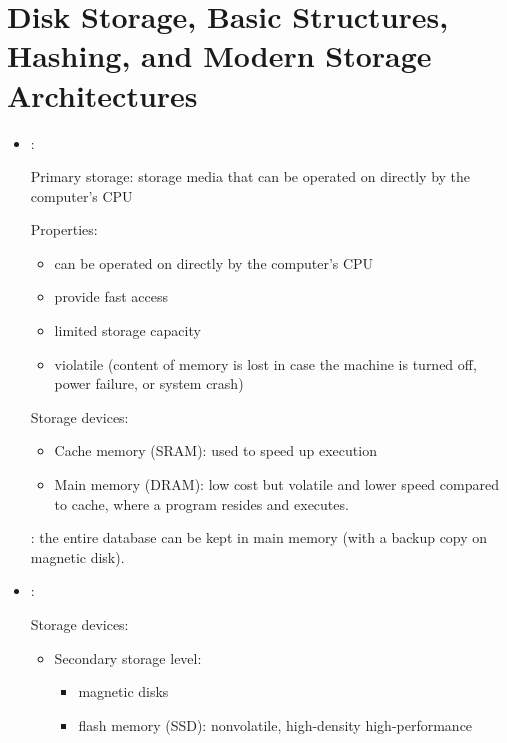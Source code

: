 \chapter{Disk Storage, Basic Structures, Hashing, and Modern Storage Architectures}

      \begin{itemize}
        \item {}:
          \par Primary storage: storage media that can be operated on directly by the computer’s CPU
          \par Properties:
            \begin{itemize}
              \item can be operated on directly by the computer’s CPU
              \item provide fast access
              \item limited storage capacity
              \item violatile (content of memory is lost in case the machine is turned off, power failure, or system crash)
            \end{itemize}
          \par Storage devices:
            \begin{itemize}
              \item Cache memory (SRAM): used to speed up execution
              \item Main memory (DRAM): low cost but volatile and lower speed
                compared to cache, where a program resides and executes.
            \end{itemize}
          \par {}: the entire database can be kept in main memory (with a backup copy on magnetic disk).
        \item {}:
          \par Storage devices:
            \begin{itemize}
              \item Secondary storage level:
              \begin{itemize}
                \item magnetic disks
                \item flash memory (SSD): nonvolatile, high-density high-performance
              \end{itemize}

\end{itemize}
\end{itemize}
